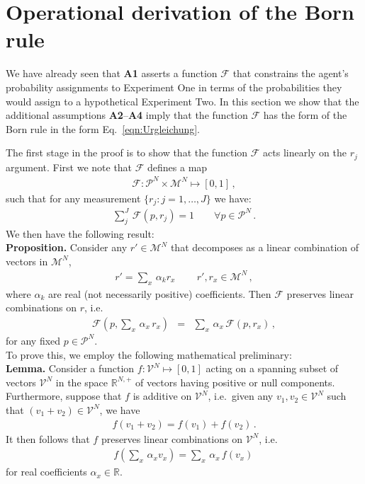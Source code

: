 \documentclass[%
 reprint,superscriptaddress,
 amsmath,amssymb,
 aps,twocolumn,pra
]{revtex4-1}
\newcommand{\eqn}[1]{\begin{eqnarray} #1 \end{eqnarray}}
\newcommand{\tbf}[1]{\textbf{#1}}
\newcommand{\zum}[2]{\displaystyle\sum_{#1}^{#2}}
\newcommand{\onestage}{{One}}
\newcommand{\twostage}{{Two}}
\begin{document}
\section{Operational derivation of the Born rule \label{sec:born}}

We have already seen that {\bf A1} asserts a function $\mathcal{F}$ that constrains the agent's probability assignments to Experiment \onestage{} in terms of the probabilities they would assign to a hypothetical Experiment \twostage. In this section we show that the additional assumptions {\bf A2}--{\bf A4} imply that the function $\mathcal{F}$ has the form of the Born rule in the form Eq.\ \eqref{eqn:Urgleichung}.

The first stage in the proof is to show that the function $\mathcal{F}$ acts linearly on the $r_j$ argument. First we note that $\mathcal{F}$ defines a map
\eqn{
\mathcal{F}: \mathcal{P}^N \times \mathcal{M}^N \mapsto [0,1] \, ,
}
such that for any measurement $\{r_j : j=1,\dots,J \}$ we have:
\eqn{ \label{eqn:frame_condition}
\zum{j}{J} \, \mathcal{F}(p,r_j) = 1 \qquad \forall p \in \mathcal{P}^N \, .
}
We then have the following result:\\

\tbf{Proposition.} Consider any $r' \in \mathcal{M}^N$ that decomposes as a linear combination of vectors in $\mathcal{M}^N$,
\eqn{
r' = \zum{x}{} \, \alpha_k r_x \, \qquad r',r_x \in \mathcal{M}^N \, ,
}
where $\alpha_k$ are real (not necessarily positive) coefficients. Then $\mathcal{F}$ preserves linear combinations on $r$, i.e.\
\eqn{ \label{eqn:linear_r}
\mathcal{F}\left(  p, \zum{x}{} \, \alpha_x \, r_{x} \right) &=& \zum{x}{} \, \alpha_x \, \mathcal{F}\left( p, r_{x} \right) \, ,
}
for any fixed $p \in \mathcal{P}^N$.\\

To prove this, we employ the following mathematical preliminary:\\

\tbf{Lemma.} Consider a function $f: \mathcal{V}^N \mapsto [0,1]$ acting on a spanning subset of vectors $\mathcal{V}^N$ in the space $\mathbb{R}^{N,+}$ of vectors having positive or null components. Furthermore, suppose that $f$ is additive on $\mathcal{V}^N$, i.e.\ given any $v_1,v_2 \in \mathcal{V}^N$ such that $(v_1+v_2) \in \mathcal{V}^N$, we have
\eqn{
f(v_1+v_2) = f(v_1) + f(v_2) \, .
}
It then follows that $f$ preserves linear combinations on $\mathcal{V}^N$, i.e.\
\eqn{ \label{eqn:prop2}
f\left( \zum{x}{} \, \alpha_x v_x \right) =  \zum{x}{} \, \alpha_x \, f\left(v_x \right) \,
}
for real coefficients $\alpha_x \in \mathbb{R}$.\\
\end{document}
